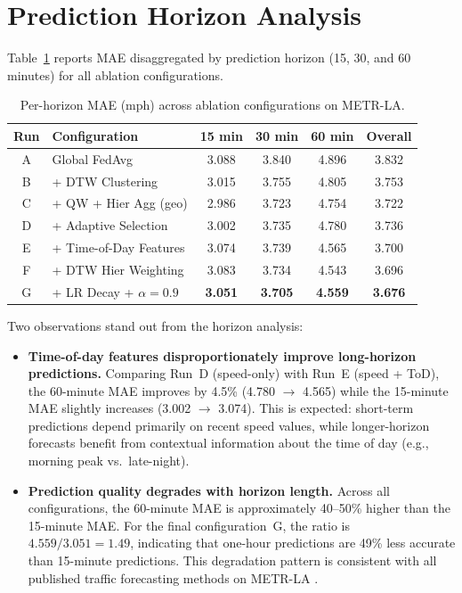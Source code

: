 \section{Prediction Horizon Analysis}
\label{sec:horizon_analysis}
Table~\ref{tab:horizon_results} reports MAE disaggregated by prediction horizon (15, 30, and 60 minutes) for all ablation configurations.
\begin{table}[H]
\centering
\caption{Per-horizon MAE (mph) across ablation configurations on METR-LA.}
\label{tab:horizon_results}
\small
\begin{tabular}{c l c c c c}
\hline
\textbf{Run} & \textbf{Configuration} & \textbf{15 min} & \textbf{30 min} & \textbf{60 min} & \textbf{Overall} \\
\hline
A & Global FedAvg & 3.088 & 3.840 & 4.896 & 3.832 \\
B & + DTW Clustering & 3.015 & 3.755 & 4.805 & 3.753 \\
C & + QW + Hier Agg (geo) & 2.986 & 3.723 & 4.754 & 3.722 \\
D & + Adaptive Selection & 3.002 & 3.735 & 4.780 & 3.736 \\
E & + Time-of-Day Features & 3.074 & 3.739 & 4.565 & 3.700 \\
F & + DTW Hier Weighting & 3.083 & 3.734 & 4.543 & 3.696 \\
G & + LR Decay + $\alpha{=}0.9$ & \textbf{3.051} & \textbf{3.705} & \textbf{4.559} & \textbf{3.676} \\
\hline
\end{tabular}
\end{table}
Two observations stand out from the horizon analysis:
\begin{itemize}
    \item \textbf{Time-of-day features disproportionately improve long-horizon predictions.} Comparing Run~D (speed-only) with Run~E (speed + ToD), the 60-minute MAE improves by 4.5\% (4.780 $\to$ 4.565) while the 15-minute MAE slightly increases (3.002 $\to$ 3.074). This is expected: short-term predictions depend primarily on recent speed values, while longer-horizon forecasts benefit from contextual information about the time of day (e.g., morning peak vs.\ late-night).
    
    \item \textbf{Prediction quality degrades with horizon length.} Across all configurations, the 60-minute MAE is approximately 40--50\% higher than the 15-minute MAE. For the final configuration~G, the ratio is $4.559 / 3.051 = 1.49$, indicating that one-hour predictions are 49\% less accurate than 15-minute predictions. This degradation pattern is consistent with all published traffic forecasting methods on METR-LA \cite{li2018, wu2019graphwavenet}.
\end{itemize}


